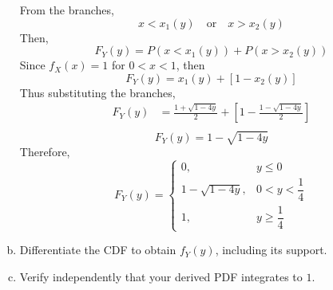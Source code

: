 \documentclass[letterpaper,12pt]{article}
\begin{document}
\begin{enumerate}[(a)]
\begin{list}{}{}
        From the branches,
        \[        x < x_1(y) \quad \text{or} \quad x > x_2(y)        \]
        Then,
        \[        F_Y(y) = P(x < x_1(y)) + P(x > x_2(y))        \]
        Since $f_X(x) = 1$ for $0 < x < 1$, then
        \[        F_Y(y) = x_1(y) + [1 - x_2(y)]        \]
        Thus substituting the branches,
        \begin{align*}
        F_Y(y) &= \frac{1 + \sqrt{1 - 4y}}{2} + \left[ 1 - \frac{1 - \sqrt{1 - 4y}}{2} \right] \\
        \end{align*}
        \[  \boxed{     F_Y(y)= 1 - \sqrt{1 - 4y}}\]
        Therefore,
        \[        F_Y(y) = \begin{cases} 0, & y \le 0 \\ 1 - \sqrt{1 - 4y}, & 0 < y < \dfrac{1}{4} \\ 1, & y \ge \dfrac{1}{4} \end{cases}
        \]
    \end{list}
    \item Differentiate the CDF to obtain $f_Y(y)$, including its support.
   
\vspace{0.5em}
    \item Verify independently that your derived PDF integrates to $1$.
    \vspace{0.5em}
\end{enumerate}
\end{document}
